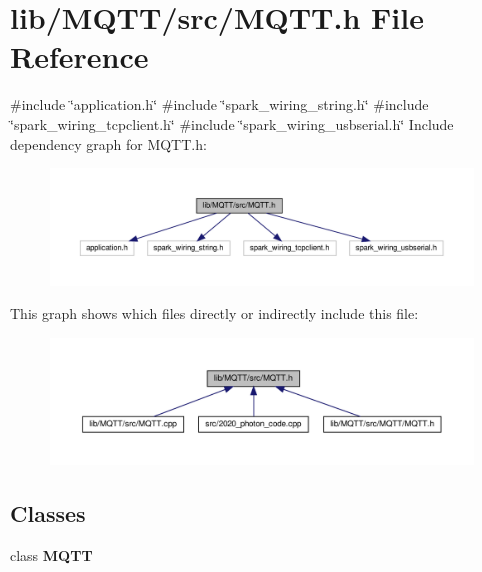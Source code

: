\section{lib/\+M\+Q\+T\+T/src/\+M\+Q\+TT.h File Reference}
\label{_m_q_t_t_8h}
{\ttfamily \#include \char`\"{}application.\+h\char`\"{}}\newline
{\ttfamily \#include \char`\"{}spark\+\_\+wiring\+\_\+string.\+h\char`\"{}}\newline
{\ttfamily \#include \char`\"{}spark\+\_\+wiring\+\_\+tcpclient.\+h\char`\"{}}\newline
{\ttfamily \#include \char`\"{}spark\+\_\+wiring\+\_\+usbserial.\+h\char`\"{}}\newline
Include dependency graph for M\+Q\+T\+T.\+h\+:\nopagebreak
\begin{figure}[H]
\begin{center}
\leavevmode
\includegraphics[width=350pt]{_m_q_t_t_8h__incl}
\end{center}
\end{figure}
This graph shows which files directly or indirectly include this file\+:\nopagebreak
\begin{figure}[H]
\begin{center}
\leavevmode
\includegraphics[width=350pt]{_m_q_t_t_8h__dep__incl}
\end{center}
\end{figure}
\subsection*{Classes}
\begin{DoxyCompactItemize}
\item 
class \textbf{ M\+Q\+TT}
\end{DoxyCompactItemize}
